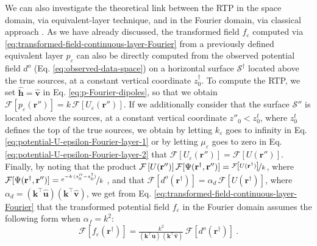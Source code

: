 We can also investigate the theoretical link between the RTP in the space domain, 
via equivalent-layer technique, and in the Fourier domain, via classical approach \cite[e.g.,][p. 331]{blakely1996}. 
As we have already discussed, the transformed field $f_{\varepsilon}$ computed via \ref{eq:transformed-field-continuous-layer-Fourier} 
from a previously defined equivalent layer $p_{\varepsilon}$ can also be directly 
computed from the observed potential field $d^{o}$ (Eq. \ref{eq:observed-data-space}) on a horizontal surface
$\mathcal{S}^{\dagger}$ located above the true sources, at a constant vertical coordinate $z^{\dagger}_{0}$.
To compute the RTP, we set $\hat{\mathbf{h}} = \hat{\mathbf{v}}$ in Eq. \ref{eq:p-Fourier-dipoles}, so that 
we obtain $\mathcal{F} [ p_{\varepsilon}(\mathbf{r}'') ] = k \, \mathcal{F} \left[ U_{\varepsilon}(\mathbf{r}'') \right]$.
If we additionally consider that the surface $\mathcal{S}''$ is located above the sources, at a constant vertical coordinate
$z''_{0} < z^{t}_{0}$, where $z^{t}_{0}$ defines the top of the true sources, we obtain by
letting $k_{\varepsilon}$ goes to infinity in Eq. \ref{eq:potential-U-epsilon-Fourier-layer-1} or 
by letting $\mu_{\varepsilon}$ goes to zero in Eq. \ref{eq:potential-U-epsilon-Fourier-layer-2} that 
$\mathcal{F} \left[ U_{\varepsilon}(\mathbf{r}'') \right] = \mathcal{F} \left[ U(\mathbf{r}'') \right]$.
Finally, by noting that the product 
$\mathcal{F} \left[ U(\mathbf{r}'') \right] \mathcal{F} [ \Psi(\mathbf{r}^{\dagger}, \mathbf{r}'') ] = 
\nicefrac{\mathcal{F} \left[ U(\mathbf{r}^{\dagger}) \right]}{k}$, where 
$\mathcal{F} [ \Psi(\mathbf{r}^{\dagger}, \mathbf{r}'') ] = \nicefrac{e^{-k \, (z''_{0} - z^{\dagger}_{0})}}{k}$ 
\citep[e.g.,][p. 275]{blakely1996}, and that 
$\mathcal{F} \left[ d^{o}(\mathbf{r}^{\dagger}) \right] = \alpha_{d} \, \mathcal{F} \left[ U(\mathbf{r}^{\dagger}) \right]$,
where
$\alpha_{d} = \left(\mathbf{k}^{\top} \hat{\mathbf{u}} \right)\left(\mathbf{k}^{\top} \hat{\mathbf{v}} \right)$,
we get from Eq. \ref{eq:transformed-field-continuous-layer-Fourier} that the transformed potential field
$f_{\varepsilon}$ in the Fourier domain assumes the following form when $\alpha_{f} = k^{2}$:
\begin{equation}
	\mathcal{F} [ f_{\varepsilon}(\mathbf{r}^{\dagger}) ] =
	\tfrac{k^{2}}{\left(\mathbf{k}^{\top} \hat{\mathbf{u}} \right) \, \left(\mathbf{k}^{\top} \hat{\mathbf{v}} \right)} \, 
	\mathcal{F} \left[ d^{o}(\mathbf{r}^{\dagger}) \right] \: .
	\label{eq:transformed-field-continuous-layer-single-step-RTP}
\end{equation}
